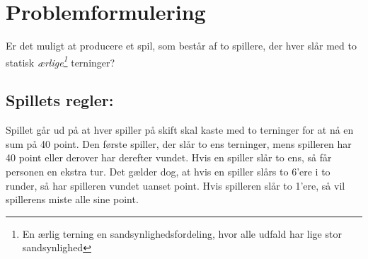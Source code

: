 \chapter{Problemformulering}
Er det muligt at producere et spil, som består af to spillere, der hver slår med to statisk \textit{ærlige\footnote{En ærlig terning en sandsynlighedsfordeling, hvor alle udfald har lige stor sandsynlighed}} terninger?
\section*{Spillets regler:}

    Spillet går ud på at hver spiller på skift skal kaste med to terninger for at nå en sum på 40 point.
    Den første spiller, der slår to ens terninger, mens spilleren har 40 point eller derover har derefter vundet.
    Hvis en spiller slår to ens, så får personen en ekstra tur.
    Det gælder dog, at hvis en spiller slårs to 6'ere i to runder, så har spilleren vundet uanset point.
    Hvis spilleren slår to 1'ere, så vil spillerens miste alle sine point.
